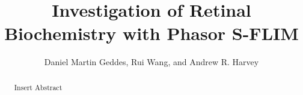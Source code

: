 \documentclass{optica-article}
\begin{document}
\title{Investigation of Retinal Biochemistry with Phasor S-FLIM}

\author{Daniel Martin Geddes, Rui Wang, and Andrew R. Harvey}

\address{School of Physics and Astronomy, University of Glasgow, Glasgow, G12 8QQ\\
Publications Department, Optica Publishing Group, 2010 Massachusetts Avenue NW, Washington, DC 20036, USA\\}




\begin{abstract}
Insert Abstract
\end{abstract}
\end{document}
